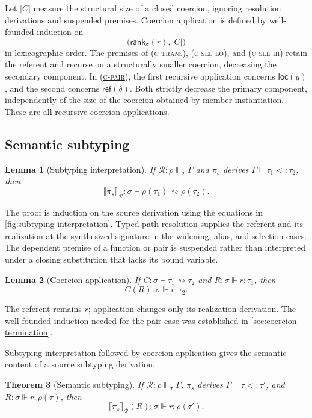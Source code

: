 \documentclass[acmsmall,screen,nonacm]{acmart}
\newtheorem{theorem}{Theorem}
\newtheorem{lemma}[theorem]{Lemma}
\newcommand{\ruleref}[1]{%
  \textsc{(\hyperref[rule:#1]{#1})}}
\newcommand{\loc}[1]{\mathsf{loc}(#1)}
\newcommand{\referentof}[1]{\mathsf{ref}(#1)}
\newcommand{\realizes}{\Vdash}
\newcommand{\coerce}{\mathrel{\rightsquigarrow}}
\newcommand{\compilepi}[2]{\llbracket #2\rrbracket_{#1}}
\newcommand{\action}[2]{#1(#2)}
\begin{document}
Let \(|C|\) measure the structural size of a closed coercion, ignoring
resolution derivations and suspended premises. Coercion application is
defined by well-founded induction on
\[
  \bigl(\mathsf{rank}_\sigma(r),|C|\bigr)
\]
in lexicographic order.  The premises of \ruleref{c-trans},
\ruleref{c-sel-lo}, and \ruleref{c-sel-hi} retain the referent and recurse on
a structurally smaller coercion, decreasing the secondary component. In
\ruleref{c-pair}, the first recursive application concerns \(\loc y\), and the
second concerns \(\referentof{\delta}\).  Both strictly decrease the primary
component, independently of the size of the coercion obtained by member
instantiation. These are all recursive coercion applications.

\subsection{Semantic subtyping}
\label{sec:coercion-totality}

\begin{lemma}[Subtyping interpretation]
\label{lem:coercion-construction}
If \(\mathcal R:\rho\realizes_\sigma\Gamma\) and
\(\pi_s\) derives \(\Gamma\vdash\tau_1<:\tau_2\), then
\[
  \compilepi{\mathcal R}{\pi_s}:
  \sigma\vdash\rho(\tau_1)\coerce\rho(\tau_2).
\]
\end{lemma}

The proof is induction on the source derivation using the equations in
\cref{fig:subtyping-interpretation}. Typed path resolution supplies the
referent and its realization at the synthesized signature in the widening,
alias, and selection
cases. The dependent premise of a function or pair is suspended rather than
interpreted under a closing substitution that lacks its bound variable.

\begin{lemma}[Coercion application]
\label{lem:coercion-action}
If \(C:\sigma\vdash\tau_1\coerce\tau_2\) and
\(R:\sigma\realizes r:\tau_1\), then
\[
  \action{C}{R}:\sigma\realizes r:\tau_2.
\]
\end{lemma}

The referent remains \(r\); application changes only its realization
derivation. The well-founded induction needed for the pair case was established in
\cref{sec:coercion-termination}.

Subtyping interpretation followed by coercion application gives the semantic
content of a source subtyping derivation.

\begin{theorem}[Semantic subtyping]
\label{thm:semantic-subtyping}
If \(\mathcal R:\rho\realizes_\sigma\Gamma\),
\(\pi_s\) derives \(\Gamma\vdash\tau<:\tau'\), and
\(R:\sigma\realizes r:\rho(\tau)\), then
\[
  \action{\compilepi{\mathcal R}{\pi_s}}{R}:
  \sigma\realizes r:\rho(\tau').
\]
\end{theorem}
\end{document}
